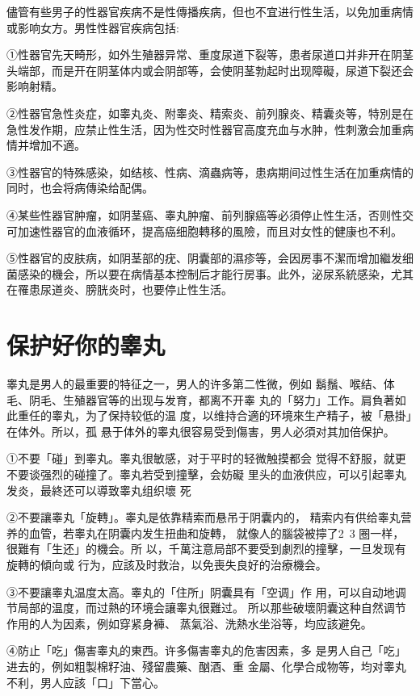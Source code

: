 \documentclass[12pt,UTF8]{ctexbook}
\begin{document}
儘管有些男子的性器官疾病不是性傳播疾病，但也不宜进行性生活，以免加重病情或影响女方。男性性器官疾病包括:

①性器官先天畸形，如外生殖器异常、重度尿道下裂等，患者尿道口并非开在阴茎头端部，而是开在阴茎体内或会阴部等，会使阴茎勃起时出现障礙，尿道下裂还会影响射精。

②性器官急性炎症，如睾丸炎、附睾炎、精索炎、前列腺炎、精囊炎等，特別是在急性发作期，应禁止性生活，因为性交时性器官高度充血与水肿，性刺激会加重病情并增加不適。

③性器官的特殊感染，如结核、性病、滴蟲病等，患病期间过性生活在加重病情的同时，也会将病傳染给配偶。

④某些性器官肿瘤，如阴茎癌、睾丸肿瘤、前列腺癌等必須停止性生活，否则性交可加速性器官的血液循环，提高癌细胞轉移的風險，而且对女性的健康也不利。

⑤性器官的皮肤病，如阴茎部的疣、阴囊部的濕疹等，会因房事不潔而增加繼发细菌感染的機会，所以要在病情基本控制后才能行房事。此外，泌尿系統感染，尤其在罹患尿道炎、膀胱炎时，也要停止性生活。

\section{保护好你的睾丸}

睾丸是男人的最重要的特征之一，男人的许多第二性微，例如
鬍鬚、喉结、体毛、阴毛、生殖器官等的出现与发育，都离不开睾
丸的「努力」工作。肩負著如此重任的睾丸，为了保持较低的温
度，以维持合適的环境來生产精子，被「悬掛」在体外。所以，孤
悬于体外的睾丸很容易受到傷害，男人必須对其加倍保护。

①不要「碰」到睾丸。睾丸很敏感，对于平时的轻微触摸都会
觉得不舒服，就更不要谈强烈的碰撞了。睾丸若受到撞擊，会妨礙
里头的血液供应，可以引起睾丸发炎，最終还可以導致睾丸组织壞
死

②不要讓睾丸「旋轉」。睾丸是依靠精索而悬吊于阴囊内的，
精索内有供给睾丸营养的血管，若睾丸在阴囊内发生扭曲和旋轉，
就像人的腦袋被擰了2~3 圈一样，很難有「生还」的機会。所
以，千萬注意局部不要受到劇烈的撞擊，一旦发现有旋轉的傾向或
行为，应該及时救治，以免喪失良好的治療機会。

③不要讓睾丸温度太高。睾丸的「住所」阴囊具有「空调」作
用，可以自动地调节局部的温度，而过熱的环境会讓睾丸很難过。
所以那些破壞阴囊这种自然调节作用的人为因素，例如穿紧身褲、
蒸氣浴、洗熱水坐浴等，均应該避免。

④防止「吃」傷害睾丸的東西。许多傷害睾丸的危害因素，多
是男人自己「吃」进去的，例如粗製棉籽油、殘留農藥、酗酒、重
金屬、化學合成物等，均对睾丸不利，男人应該「口」下當心。
\end{document}
